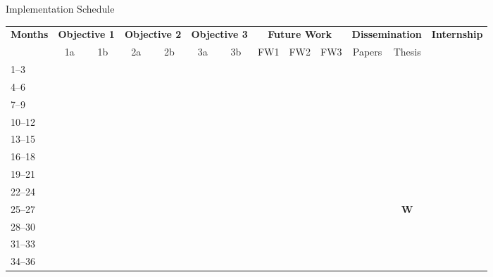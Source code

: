 \documentclass[aspectratio=169]{beamer}
\newcommand{\cmark}{\checkmark}
\newcommand{\wmark}{\textbf{W}} %
\begin{document}
\begin{frame}{Implementation Schedule}
\centering
\scriptsize
\setlength{\tabcolsep}{7pt}
\begin{tabularx}{\textwidth}{@{}l*{12}{c}@{}}
\toprule
\textbf{Months} &
\multicolumn{2}{c}{\textbf{Objective 1}} &
\multicolumn{2}{c}{\textbf{Objective 2}} &
\multicolumn{2}{c}{\textbf{Objective 3}} &
\multicolumn{3}{c}{\textbf{Future Work}} &
\multicolumn{2}{c}{\textbf{Dissemination}} &
\multicolumn{1}{c}{\textbf{Internship}} \\
\cmidrule(lr){2-3}\cmidrule(lr){4-5}\cmidrule(lr){6-7}\cmidrule(lr){8-10}\cmidrule(lr){11-12}\cmidrule(lr){13-13}
& 1a & 1b & 2a & 2b & 3a & 3b & FW1 & FW2 & FW3 & Papers & Thesis & \\ 
\midrule
\rowcolor{completed}  1--3  & \cmark &        & \cmark &        &        &        &        &        &        &        &        &        \\
\rowcolor{completed}  4--6  & \cmark & \cmark & \cmark & \cmark &        &        &        &        &        &        &        &        \\
\rowcolor{completed}  7--9  &        & \cmark &        & \cmark &        &        &        &        &        &        &        &        \\
\rowcolor{completed} 10--12 &        & \cmark &        & \cmark & \cmark &        &        &        &        &        &        &        \\
\rowcolor{completed} 13--15 &        & \cmark &        & \cmark & \cmark &        &        &        &        & \cmark &        &        \\
\rowcolor{completed} 16--18 &        & \cmark &        & \cmark & \cmark &        &        &        &        & \cmark &        &        \\
\midrule
19--21 &        &        &        &        &        &        & \cmark &        &        &        &        &        \\
22--24 &        &        &        &        &        & \cmark & \cmark & \cmark &        &        &        &        \\
25--27 &        &        &        &        &        & \cmark &        & \cmark & \cmark & \cmark & \cellcolor{writing}\wmark &        \\
28--30 &        &        &        &        &        &        &        & \cmark & \cmark &        & \cellcolor{writing}\cmark &        \\
31--33 &        &        &        &        &        &        &        &        & \cmark & \cmark & \cellcolor{writing}\cmark & \cmark \\
34--36 &        &        &        &        &        &        &        &        &        &        & \cellcolor{writing}\cmark & \cmark \\
\bottomrule
\end{tabularx}


\end{frame}
\end{document}
